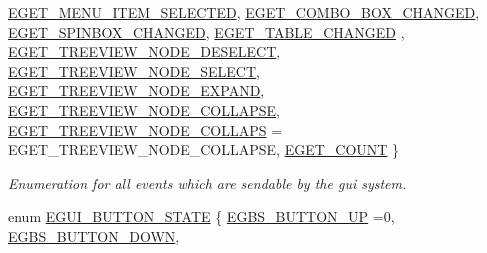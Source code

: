 \begin{DoxyCompactItemize}
\newline
\hyperlink{namespaceirr_1_1gui_aeac71ad17341a4b6e9026ae11d576808a71bd9c25dd2545b57654e08fac753a52}{E\+G\+E\+T\+\_\+\+M\+E\+N\+U\+\_\+\+I\+T\+E\+M\+\_\+\+S\+E\+L\+E\+C\+T\+ED}, 
\hyperlink{namespaceirr_1_1gui_aeac71ad17341a4b6e9026ae11d576808ae448a7d6dc41ee7265c5540f91e6735f}{E\+G\+E\+T\+\_\+\+C\+O\+M\+B\+O\+\_\+\+B\+O\+X\+\_\+\+C\+H\+A\+N\+G\+ED}, 
\hyperlink{namespaceirr_1_1gui_aeac71ad17341a4b6e9026ae11d576808af947b1a03eb585042fb3eb25317bd797}{E\+G\+E\+T\+\_\+\+S\+P\+I\+N\+B\+O\+X\+\_\+\+C\+H\+A\+N\+G\+ED}, 
\hyperlink{namespaceirr_1_1gui_aeac71ad17341a4b6e9026ae11d576808a180c12552c55e6888c93404fafebb63b}{E\+G\+E\+T\+\_\+\+T\+A\+B\+L\+E\+\_\+\+C\+H\+A\+N\+G\+ED}
, \newline
\hyperlink{namespaceirr_1_1gui_aeac71ad17341a4b6e9026ae11d576808a8df686043abb06d127e78805705675bd}{E\+G\+E\+T\+\_\+\+T\+R\+E\+E\+V\+I\+E\+W\+\_\+\+N\+O\+D\+E\+\_\+\+D\+E\+S\+E\+L\+E\+CT}, 
\hyperlink{namespaceirr_1_1gui_aeac71ad17341a4b6e9026ae11d576808a620d2c39c1b4faddce7a371e8e9d6fed}{E\+G\+E\+T\+\_\+\+T\+R\+E\+E\+V\+I\+E\+W\+\_\+\+N\+O\+D\+E\+\_\+\+S\+E\+L\+E\+CT}, 
\hyperlink{namespaceirr_1_1gui_aeac71ad17341a4b6e9026ae11d576808a678b0cc0d762db1d6f6a03e212e2a53c}{E\+G\+E\+T\+\_\+\+T\+R\+E\+E\+V\+I\+E\+W\+\_\+\+N\+O\+D\+E\+\_\+\+E\+X\+P\+A\+ND}, 
\hyperlink{namespaceirr_1_1gui_aeac71ad17341a4b6e9026ae11d576808a9e7fcda0381eb76d7f73c726573319af}{E\+G\+E\+T\+\_\+\+T\+R\+E\+E\+V\+I\+E\+W\+\_\+\+N\+O\+D\+E\+\_\+\+C\+O\+L\+L\+A\+P\+SE}, 
\newline
\hyperlink{namespaceirr_1_1gui_aeac71ad17341a4b6e9026ae11d576808a1f45bcb325f856739a94947cb8a2375e}{E\+G\+E\+T\+\_\+\+T\+R\+E\+E\+V\+I\+E\+W\+\_\+\+N\+O\+D\+E\+\_\+\+C\+O\+L\+L\+A\+PS} = E\+G\+E\+T\+\_\+\+T\+R\+E\+E\+V\+I\+E\+W\+\_\+\+N\+O\+D\+E\+\_\+\+C\+O\+L\+L\+A\+P\+SE, 
\hyperlink{namespaceirr_1_1gui_aeac71ad17341a4b6e9026ae11d576808a1d9ebb1e5a6fc245aef9132c8d0c71c2}{E\+G\+E\+T\+\_\+\+C\+O\+U\+NT}
 \}\begin{DoxyCompactList}\small\item\em Enumeration for all events which are sendable by the gui system. \end{DoxyCompactList}
\item 
enum \hyperlink{namespaceirr_1_1gui_a2520445dec46e00684645ef8053aebb5}{E\+G\+U\+I\+\_\+\+B\+U\+T\+T\+O\+N\+\_\+\+S\+T\+A\+TE} \{ \newline
\hyperlink{namespaceirr_1_1gui_a2520445dec46e00684645ef8053aebb5a40be4ee871a64405e53480188c826c26}{E\+G\+B\+S\+\_\+\+B\+U\+T\+T\+O\+N\+\_\+\+UP} =0, 
\hyperlink{namespaceirr_1_1gui_a2520445dec46e00684645ef8053aebb5a41b73a3114226b458cfacc78555b0576}{E\+G\+B\+S\+\_\+\+B\+U\+T\+T\+O\+N\+\_\+\+D\+O\+WN}, 

\end{DoxyCompactItemize}
